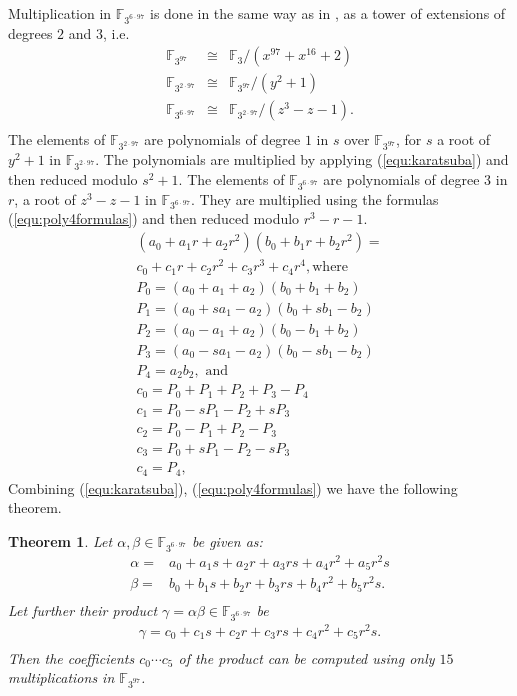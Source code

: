 \documentclass{article}
\newcommand{\F}{\mathbb{F}}
\newtheorem{thm}{Theorem}
\begin{document}
Multiplication in $\F_{3^{6 \cdot 97}}$ is done in the same way as in
\cite{kermar05}, as a tower of extensions of degrees $2$ and $3$, i.e.
$$
\begin{array}{lcl}
\F_{3^{97}} & \cong & \F_{3}/(x^{97}+x^{16}+2)\\ 
\F_{3^{2 \cdot 97}} & \cong & \F_{3^{97}} / (y^2+1)\\
\F_{3^{6 \cdot 97}} & \cong & \F_{3^{2 \cdot 97}} / (z^{3}-z-1).\\
\end{array}
$$
The elements of $\F_{3^{2 \cdot 97}}$ are polynomials of degree $1$ in
$s$ over $\F_{3^{97}}$, for $s$ a root of $y^2+1$ in $\F_{3^{2 \cdot 97}}$.
The polynomials are multiplied by applying (\ref{equ:karatsuba}) and then
reduced modulo $s^2+1$. The elements of $\F_{3^{6 \cdot 97}}$ are
polynomials of degree $3$ in $r$, a root of $z^3-z-1$ in $\F_{3^{6
    \cdot 97}}$. They are multiplied using the formulas
(\ref{equ:poly4formulas}) and then reduced modulo $r^3-r-1$.
\begin{equation}
\begin{array}{l}
(a_0+a_1r+a_2r^2)(b_0+b_1r+b_2r^2)=\\
c_0+c_1r+c_2r^2+c_3r^3+c_4r^4, \text{where}\\
P_0 = (a_{0}+a_{1}+a_{2})(b_{0}+b_{1}+b_{2})\\
P_1 = (a_{0}+sa_{1}-a_{2})(b_{0}+sb_{1}-b_{2})\\
P_2 = (a_{0}-a_{1}+a_{2})(b_{0}-b_{1}+b_{2})\\
P_3 = (a_{0}-sa_{1}-a_{2})(b_{0}-sb_{1}-b_{2})\\
P_4 = a_2b_2, \text{ and}\\
c_{0}=P_{0}+P_{1}+P_{2}+P_{3}-P_{4}\\
c_{1}=P_{0}-sP_{1}-P_{2}+sP_{3}\\
c_{2}=P_{0}-P_{1}+P_{2}-P_{3}\\
c_{3}=P_{0}+sP_{1}-P_{2}-sP_{3}\\
c_{4}=P_{4},
\end{array}
\label{equ:poly4formulas}
\end{equation}
Combining (\ref{equ:karatsuba}), (\ref{equ:poly4formulas}) we have the
following theorem.

\begin{thm}
Let $\alpha, \beta \in \F_{3^{6 \cdot 97}}$ be given as:
\begin{align*}
\alpha = & a_0+a_1s+a_2r+a_3rs+a_4r^2+a_5r^2s\\
\beta = & b_0+b_1s+b_2r+b_3rs+b_4r^2+b_5r^2s.\\
\end{align*}
Let further their product $\gamma = \alpha \beta \in \F_{3^{6 \cdot 97}}$ be 
\begin{align*}
\gamma = c_0+c_1s+c_2r+c_3rs+c_4r^2+c_5r^2s.\\
\end{align*}
Then the coefficients $c_0 \cdots c_5$ of the product can be computed
using only $15$ multiplications in $\F_{3^{97}}$.
\end{thm}
\end{document}
